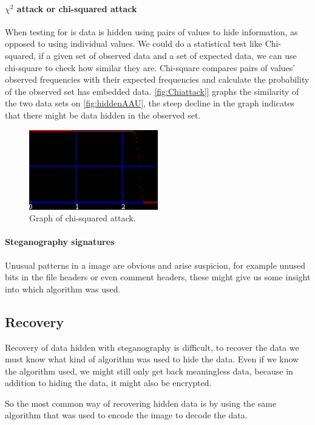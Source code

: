 \paragraph*{$\chi^2$ attack or chi-squared attack}
When testing for is data is hidden using pairs of values to hide information, as opposed to using individual values.
We could do a statistical test like Chi-squared, if a given set of observed data and a set of expected data, we can use chi-square to check how similar they are.
Chi-square compares pairs of values' observed frequencies with their expected frequencies and calculate the probability of the observed set has embedded data.
\ref{fig:Chiattack]} graphs the similarity of the two data sets on \ref{fig:hiddenAAU}, the steep decline in the graph indicates that there might be data hidden in the observed set.

\begin{figure}
	\centering
	\includegraphics[width=0.5\textwidth]{figures/ChiSquareAttack.png}
	\caption{Graph of chi-squared attack.}
	\label{fig:Chiattack}
\end{figure}

\paragraph*{Steganography signatures}
Unusual patterns in a image are obvious and arise suspicion, for example unused bits in the file headers or even comment headers, these might give us some insight into which algorithm was used.

\subsection{Recovery}
Recovery of data hidden with steganography is difficult, to recover the data we must know what kind of algorithm was used to hide the data.
Even if we know the algorithm used, we might still only get back meaningless data, because in addition to hiding the data, it might also be encrypted.

So the most common way of recovering hidden data is by using the same algorithm that was used to encode the image to decode the data.
